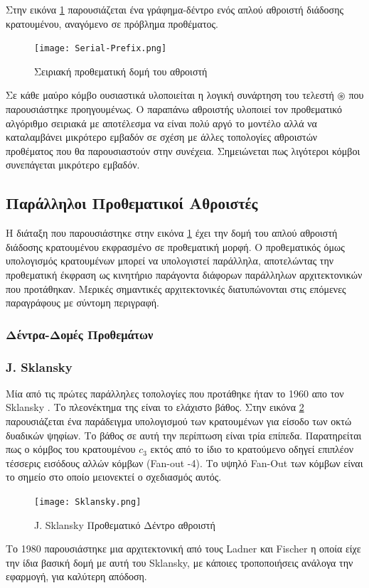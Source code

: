 Στην εικόνα \ref{Serial-PrefixTree} παρουσιάζεται ένα γράφημα-δέντρο ενός απλού αθροιστή διάδοσης κρατουμένου, αναγόμενο σε πρόβλημα προθέματος.\\ 
\begin{figure}[H]
\centering
\texttt{[image: Serial-Prefix.png]}
\caption{Σειριακή προθεματική δομή του αθροιστή}
\label{Serial-PrefixTree}
\end{figure}
Σε κάθε μαύρο κόμβο ουσιαστικά υλοποιείται η λογική συνάρτηση του τελεστή $\circledast$
που παρουσιάστηκε προηγουμένως. Ο παραπάνω αθροιστής υλοποιεί τον προθεματικό αλγόριθμο
σειριακά με αποτέλεσμα να είναι πολύ αργό το μοντέλο αλλά να καταλαμβάνει μικρότερο εμβαδόν
σε σχέση με άλλες τοπολογίες αθροιστών προθέματος που θα παρουσιαστούν στην συνέχεια. Σημειώνεται πως λιγότεροι κόμβοι συνεπάγεται μικρότερο εμβαδόν.












\subsection{Παράλληλοι Προθεματικοί Αθροιστές}
Η διάταξη που παρουσιάστηκε στην εικόνα \ref{Serial-PrefixTree} έχει την δομή 
του απλού αθροιστή διάδοσης κρατουμένου εκφρασμένο σε προθεματική μορφή. Ο προθεματικός
όμως υπολογισμός κρατουμένων μπορεί να υπολογιστεί παράλληλα, αποτελώντας την προθεματική 
έκφραση ως κινητήριο παράγοντα διάφορων παράλληλων αρχιτεκτονικών που προτάθηκαν.
Μερικές σημαντικές αρχιτεκτονικές διατυπώνονται στις επόμενες παραγράφους με σύντομη
περιγραφή.




\subsubsection{Δέντρα-Δομές Προθεμάτων}


\subsubsection*{J. Sklansky}
Μία από τις πρώτες παράλληλες τοπολογίες που προτάθηκε ήταν το 1960 απο τον Sklansky \cite{5219822}. Το πλεονέκτημα της είναι το ελάχιστο βάθος. Στην εικόνα \ref{SklanskyTree} παρουσιάζεται ένα παράδειγμα υπολογισμού των κρατουμένων για είσοδο των οκτώ δυαδικών ψηφίων. Το βάθος σε αυτή την περίπτωση είναι τρία επίπεδα. Παρατηρείται πως ο κόμβος του κρατουμένου $c_3$ εκτός από το ίδιο το κρατούμενο οδηγεί επιπλέον τέσσερις εισόδους αλλών κόμβων (Fan-out -4). Το υψηλό Fan-Out των κόμβων είναι το σημείο στο οποίο μειονεκτεί ο σχεδιασμός αυτός.
\begin{figure}[H]
    \centering
    \texttt{[image: Sklansky.png]}
    \caption{J. Sklansky Προθεματικό Δέντρο αθροιστή}
    \label{SklanskyTree}
\end{figure}
Το 1980 παρουσιάστηκε μια αρχιτεκτονική από τους Ladner και Fischer 
\cite{Ladner:1980:PPC:322217.322232} η οποία είχε την ίδια βασική δομή με αυτή του
Sklansky, με κάποιες τροποποιήσεις ανάλογα την εφαρμογή, για καλύτερη απόδοση.




